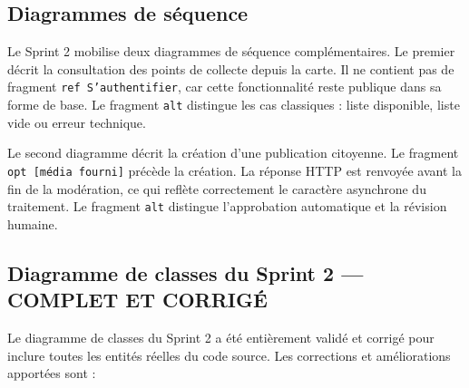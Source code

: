 \subsection{Diagrammes de séquence}

Le Sprint 2 mobilise deux diagrammes de séquence complémentaires. Le premier décrit la consultation des points de collecte depuis la carte. Il ne contient pas de fragment \texttt{ref S'authentifier}, car cette fonctionnalité reste publique dans sa forme de base. Le fragment \texttt{alt} distingue les cas classiques : liste disponible, liste vide ou erreur technique.

\label{fig:r1_s2_seq_points}

Le second diagramme décrit la création d'une publication citoyenne. Le fragment \texttt{opt [média fourni]} précède la création. La réponse HTTP est renvoyée avant la fin de la modération, ce qui reflète correctement le caractère asynchrone du traitement. Le fragment \texttt{alt} distingue l'approbation automatique et la révision humaine.

\label{fig:r1_s2_seq_post}

\subsection{Diagramme de classes du Sprint 2 — COMPLET ET CORRIGÉ}
\label{subsec:r1_s2_class_corrected}

Le diagramme de classes du Sprint 2 a été entièrement validé et corrigé pour inclure toutes les entités réelles du code source. Les corrections et améliorations apportées sont :

